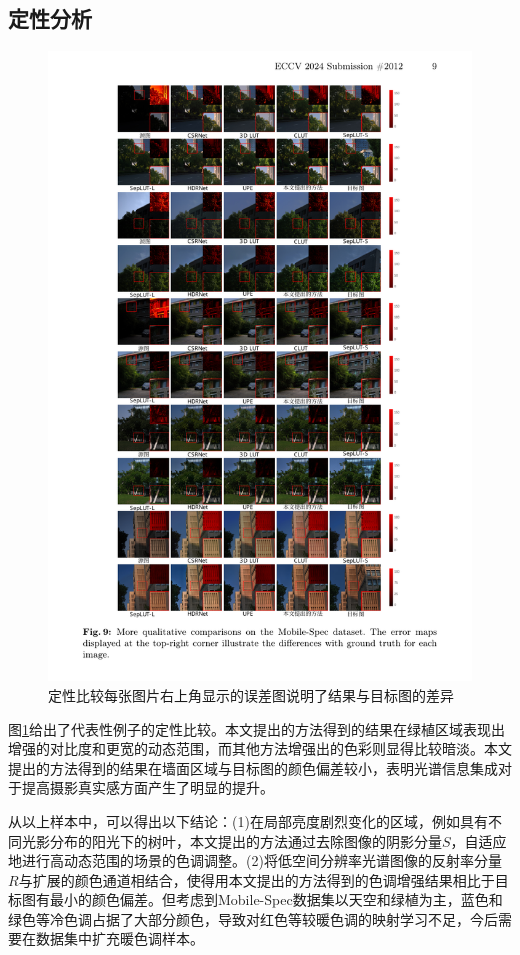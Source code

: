 \documentclass[
    type = master, %
    degree = academic,        %
    decl-page,  %
  ]{njuthesis}
\begin{document}
\subsection{定性分析}
\begin{figure}
	\centering
	\includegraphics[width=0.9\linewidth]{docs/fig-chap3/fig-3-result-long.pdf}
	\caption{定性比较\quad 每张图片右上角显示的误差图说明了结果与目标图的差异}
	\label{fig:enhance result}
\end{figure}
图\ref{fig:enhance result}给出了代表性例子的定性比较。本文提出的方法得到的结果在绿植区域表现出增强的对比度和更宽的动态范围，而其他方法增强出的色彩则显得比较暗淡。本文提出的方法得到的结果在墙面区域与目标图的颜色偏差较小，表明光谱信息集成对于提高摄影真实感方面产生了明显的提升。


从以上样本中，可以得出以下结论：(1)在局部亮度剧烈变化的区域，例如具有不同光影分布的阳光下的树叶，本文提出的方法通过去除图像的阴影分量$S$，自适应地进行高动态范围的场景的色调调整。(2)将低空间分辨率光谱图像的反射率分量$R$与扩展的颜色通道相结合，使得用本文提出的方法得到的色调增强结果相比于目标图有最小的颜色偏差。但考虑到Mobile-Spec数据集以天空和绿植为主，蓝色和绿色等冷色调占据了大部分颜色，导致对红色等较暖色调的映射学习不足，今后需要在数据集中扩充暖色调样本。
\end{document}
